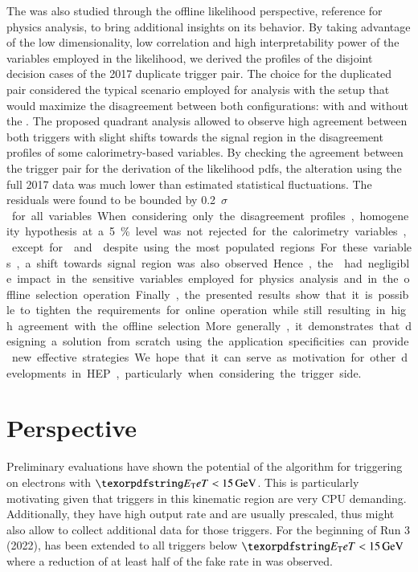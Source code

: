 The \rnn{} was also studied through the offline likelihood perspective,
reference for physics analysis, to bring additional insights on its behavior. By
taking advantage of the low dimensionality, low correlation and high
interpretability power of the variables employed in the likelihood, we derived
the profiles of the disjoint decision cases of the 2017 duplicate trigger pair.
The choice for the duplicated pair considered the typical scenario employed for
analysis with the setup that would maximize the disagreement between both
configurations: with and without the \rnn{}. The proposed quadrant analysis
allowed to observe high agreement between both triggers with slight shifts
towards the signal region in the disagreement profiles of some calorimetry-based
variables. By checking the agreement between the trigger pair for the derivation
of the likelihood pdfs, the alteration using the full 2017 data was much lower
than estimated statistical fluctuations. The residuals were found to be bounded
by \SI{0.2}{$\sigma$} for all variables. When considering only the
disagreement profiles, homogeneity hypothesis at a \SI{5}{\%} level was not
rejected for the calorimetry variables, except for \reta{} and \rhad{} despite
using the most populated regions. For these variables, a shift towards signal
region was also observed. Hence, the \rnn{} had negligible impact in the
sensitive variables employed for physics analysis and in the offline selection
operation.

Finally, the presented results show that it is possible to tighten the requirements for online operation while still resulting in high agreement with the offline
selection. More generally, it demonstrates that designing a solution from scratch using the application specificities can provide new effective
strategies. We hope that it can serve as motivation for other developments in
HEP, particularly when considering the trigger side.

\section{Perspective}


Preliminary evaluations have shown the potential of the \rnn{} algorithm for
triggering on electrons with $\et<\SI{15}{\GeV}$. This is particularly motivating given that triggers in this kinematic region are very
CPU demanding. Additionally, they have high output rate and are usually
prescaled, thus \rnn{} might also allow to collect additional data for those
triggers. For the beginning of Run 3 (2022), \rnn{} has been extended to all triggers below $\et<\SI{15}{\GeV}$ where a reduction of at least half of the fake rate in \fastcalo was observed.


